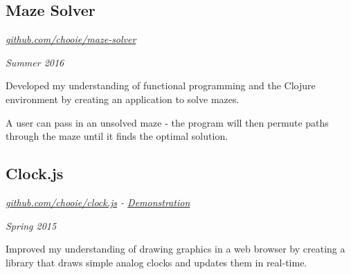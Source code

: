 \subsection*{Maze Solver}
\noindent\begin{minipage}[b]{0.8\textwidth}
  \flushleft
  \emph{
    \href{https://github.com/chooie/maze-solver} {github.com/chooie/maze-solver}
  }
\end{minipage}
\noindent\begin{minipage}[b]{0.2\textwidth}
  \flushright
  \emph{Summer 2016}
\end{minipage}

Developed my understanding of functional programming and the Clojure environment
by creating an application to solve mazes.

A user can pass in an unsolved maze - the program will then permute paths
through the maze until it finds the optimal solution.

\subsection*{Clock.js}
\noindent\begin{minipage}[b]{0.5\textwidth}
  \flushleft
  \emph{
    \href{https://github.com/chooie/clock.js} {github.com/chooie/clock.js} -
    \href {https://chooie.github.io/clock.js} {Demonstration}
  }
\end{minipage}
\noindent\begin{minipage}[b]{0.5\textwidth}
  \flushright
  \emph{Spring 2015}
\end{minipage}

Improved my understanding of drawing graphics in a web browser by creating a
library that draws simple analog clocks and updates them in real-time.

